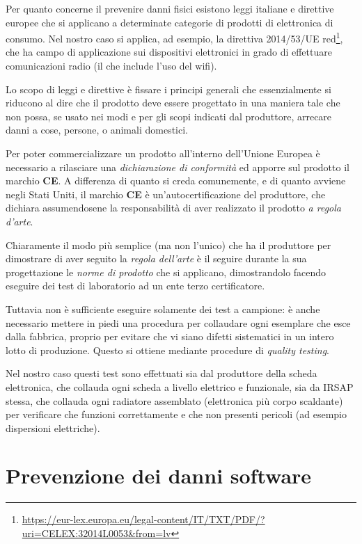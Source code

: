 \documentclass[12pt,a4paper,twoside,titlepage]{book}
\begin{document}
Per quanto concerne il prevenire danni fisici esistono leggi italiane e direttive europee che si applicano 
a determinate categorie di prodotti di elettronica di consumo. Nel nostro caso si applica, ad esempio, la
direttiva 2014/53/UE \acrshort{red}\footnote{\url{https://eur-lex.europa.eu/legal-content/IT/TXT/PDF/?uri=CELEX:32014L0053&from=lv}},
che ha campo di applicazione sui dispositivi elettronici in grado di 
effettuare comunicazioni radio (il che include l'uso del \Gls{wifi}). 

Lo scopo di leggi e direttive è fissare i principi generali che essenzialmente si riducono al dire che 
il prodotto deve essere progettato in una maniera tale che non possa, se usato nei modi e per gli scopi 
indicati dal produttore, arrecare danni a cose, persone, o animali domestici. 

Per poter commercializzare un prodotto all'interno dell'Unione Europea è necessario a rilasciare una 
\textit{dichiarazione di conformità} ed apporre sul prodotto il marchio \textbf{CE}. A differenza di 
quanto si creda comunemente, e di quanto avviene negli Stati Uniti, il marchio \textbf{CE} è 
un'autocertificazione del produttore, che dichiara assumendosene la responsabilità di aver realizzato 
il prodotto \textit{a regola d'arte}. 

Chiaramente il modo più semplice (ma non l'unico) che ha il produttore per dimostrare di aver seguito la
\textit{regola dell'arte} è il seguire durante la sua progettazione le \textit{norme di prodotto} che si 
applicano, dimostrandolo facendo eseguire dei test di laboratorio ad un ente terzo certificatore. 

Tuttavia non è sufficiente eseguire solamente dei test a campione: è anche necessario mettere 
in piedi una procedura per collaudare ogni esemplare che esce dalla fabbrica, proprio per evitare che vi siano 
difetti sistematici in un intero lotto di produzione. Questo si ottiene mediante procedure di \textit{quality testing}. 

Nel nostro caso questi test sono effettuati sia dal produttore della scheda elettronica, 
che collauda ogni scheda a livello elettrico e funzionale, sia da IRSAP stessa, che collauda ogni radiatore 
assemblato (elettronica più corpo scaldante) per verificare che funzioni correttamente e che non presenti 
pericoli (ad esempio dispersioni elettriche). 

\section{Prevenzione dei danni software}
\end{document}
